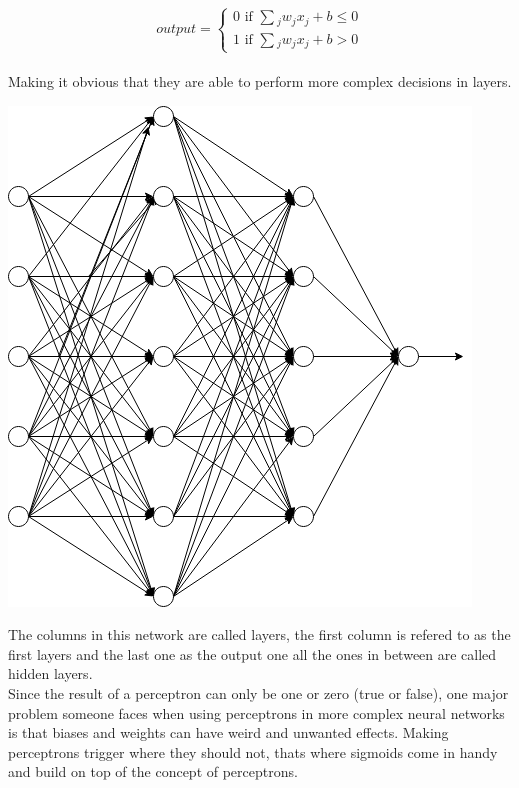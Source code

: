\vspace{0.5cm}
    \begin{equation*}
        output=
        \begin{cases}
            0 \text{ if } \sum{_j}{w_jx_j+b \le 0}\\
            1 \text{ if } \sum{_j}{w_jx_j+b > 0}
        \end{cases}
    \end{equation*}
\vspace{0.5cm} \\
Making it obvious that they are able to perform more complex decisions in layers.
\begin{center}
    \includegraphics[scale=0.5]{images/neurons/neural_network.png}
\end{center}
\newpage
\noindent
The columns in this network are called layers, the first column is refered to as the first layers and the last one as the output one all the
ones in between are called hidden layers. \\
Since the result of a perceptron can only be one or zero (true or false), one major problem someone faces when using perceptrons in more
complex neural networks is that biases and weights can have weird and unwanted effects. Making perceptrons trigger where they should not,
thats where sigmoids come in handy and build on top of the concept of perceptrons.

